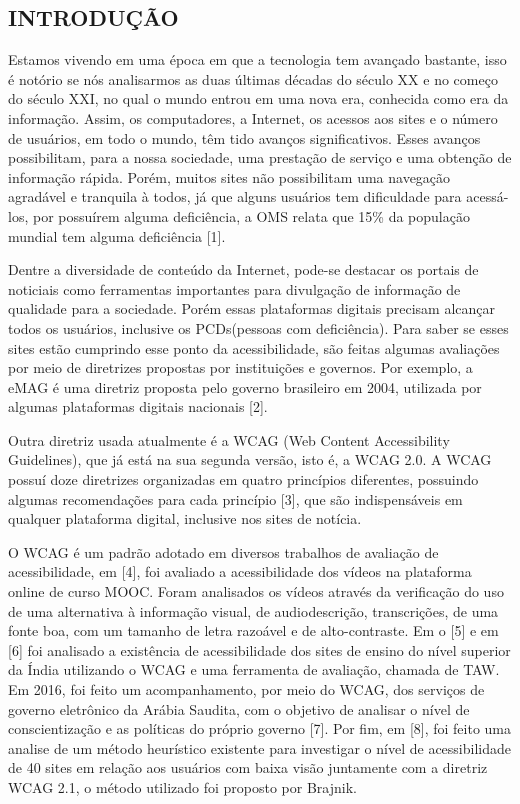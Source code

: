 \documentclass[a4paper]{article}
\begin{document}
\begin{titlepage}
	\begin{center}
		\tableofcontents
	\end{center}
\end{titlepage}
\begin{titlepage}
\section{INTRODUÇÃO}
\fontsize{12pt}{0pt}\selectfont
\onehalfspacing
Estamos vivendo em uma época em que a tecnologia tem avançado bastante, isso é notório se nós analisarmos as duas últimas décadas do século XX e no começo do século XXI, no qual o mundo entrou em uma nova era, conhecida como era da informação. Assim, os computadores, a Internet, os acessos aos sites e o número de usuários, em todo o mundo, têm tido avanços significativos. Esses avanços possibilitam, para a nossa sociedade, uma prestação de serviço e uma obtenção de informação rápida. Porém, muitos sites não possibilitam uma navegação agradável e tranquila à todos, já que alguns usuários tem dificuldade para acessá-los, por possuírem alguma deficiência, a OMS relata que 15\% da população mundial tem alguma deficiência [1].

Dentre a diversidade de conteúdo da Internet, pode-se destacar os portais de noticiais como ferramentas importantes para divulgação de informação de qualidade para a sociedade. Porém essas plataformas digitais precisam alcançar todos os usuários, inclusive os PCDs(pessoas com deficiência). Para saber se esses sites estão cumprindo esse ponto da acessibilidade, são feitas algumas avaliações por meio de diretrizes propostas por instituições e governos. Por exemplo, a eMAG é uma diretriz proposta pelo governo brasileiro em 2004, utilizada por algumas plataformas digitais nacionais [2].

Outra diretriz usada atualmente é a WCAG (Web Content Accessibility Guidelines), que já está na sua segunda versão, isto é, a WCAG 2.0. A WCAG possuí doze diretrizes organizadas em quatro princípios diferentes, possuindo algumas recomendações para cada princípio [3], que são indispensáveis em qualquer plataforma digital, inclusive nos sites de notícia.

O WCAG é um padrão adotado em diversos trabalhos de avaliação de acessibilidade, em [4], foi avaliado a acessibilidade dos vídeos na plataforma online de curso MOOC. Foram analisados os vídeos através da verificação do uso de uma alternativa à informação visual, de audiodescrição, transcrições, de uma fonte boa, com um tamanho de letra razoável e de alto-contraste. Em o [5] e em [6] foi analisado a existência de acessibilidade dos sites de ensino do nível superior da Índia utilizando o WCAG e uma ferramenta de avaliação, chamada de TAW. Em 2016, foi feito um acompanhamento, por meio do WCAG, dos serviços de governo eletrônico da Arábia Saudita, com o objetivo de analisar o nível de conscientização e as políticas do próprio governo [7]. Por fim, em [8], foi feito uma analise de um método heurístico existente para investigar o nível de acessibilidade de 40 sites em relação aos usuários com baixa visão juntamente com a diretriz WCAG 2.1, o método utilizado foi proposto por Brajnik.


\end{titlepage}
\end{document}
